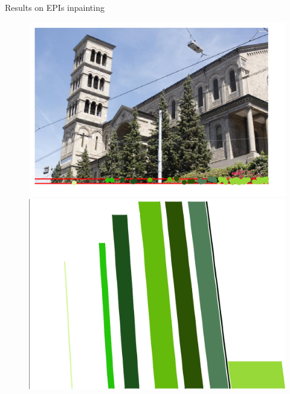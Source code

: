 \begin{frame}{Results on EPIs inpainting}
\begin{figure}[!tbp]
  \centering
  \begin{minipage}[b]{0.40\textwidth}
    \includegraphics[width=\textwidth]{./images/EPI-strip.png}
  \end{minipage}
	\pause
  \begin{minipage}[b]{0.40\textwidth}
    \includegraphics[width=\textwidth]{./images/EPI-dense.png}
  \end{minipage}
\end{figure}
\pause


\end{frame}
